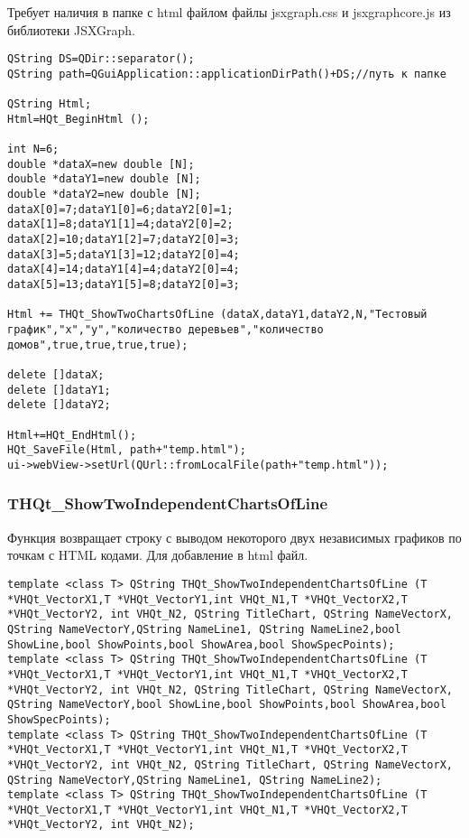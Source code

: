 \documentclass[a4paper,12pt]{article}
\begin{document}
Требует наличия в папке с html файлом файлы jsxgraph.css и jsxgraphcore.js из библиотеки JSXGraph.


\begin{lstlisting}[label=code_use_THQt_ShowTwoChartsOfLine,caption=Пример использования]
QString DS=QDir::separator();
QString path=QGuiApplication::applicationDirPath()+DS;//путь к папке

QString Html;
Html=HQt_BeginHtml ();

int N=6;
double *dataX=new double [N];
double *dataY1=new double [N];
double *dataY2=new double [N];
dataX[0]=7;dataY1[0]=6;dataY2[0]=1;
dataX[1]=8;dataY1[1]=4;dataY2[0]=2;
dataX[2]=10;dataY1[2]=7;dataY2[0]=3;
dataX[3]=5;dataY1[3]=12;dataY2[0]=4;
dataX[4]=14;dataY1[4]=4;dataY2[0]=4;
dataX[5]=13;dataY1[5]=8;dataY2[0]=3;

Html += THQt_ShowTwoChartsOfLine (dataX,dataY1,dataY2,N,"Тестовый график","x","y","количество деревьев","количество домов",true,true,true,true);

delete []dataX;
delete []dataY1;
delete []dataY2;

Html+=HQt_EndHtml();
HQt_SaveFile(Html, path+"temp.html");
ui->webView->setUrl(QUrl::fromLocalFile(path+"temp.html"));
\end{lstlisting}

\subsubsection{THQt\_ShowTwoIndependentChartsOfLine}\label{THQt_ShowTwoIndependentChartsOfLine}

Функция возвращает строку с выводом некоторого двух независимых графиков по точкам с HTML кодами. Для добавление в html файл.


\begin{lstlisting}[label=code_syntax_THQt_ShowTwoIndependentChartsOfLine,caption=Синтаксис]
template <class T> QString THQt_ShowTwoIndependentChartsOfLine (T *VHQt_VectorX1,T *VHQt_VectorY1,int VHQt_N1,T *VHQt_VectorX2,T *VHQt_VectorY2, int VHQt_N2, QString TitleChart, QString NameVectorX, QString NameVectorY,QString NameLine1, QString NameLine2,bool ShowLine,bool ShowPoints,bool ShowArea,bool ShowSpecPoints);
template <class T> QString THQt_ShowTwoIndependentChartsOfLine (T *VHQt_VectorX1,T *VHQt_VectorY1,int VHQt_N1,T *VHQt_VectorX2,T *VHQt_VectorY2, int VHQt_N2, QString TitleChart, QString NameVectorX, QString NameVectorY,bool ShowLine,bool ShowPoints,bool ShowArea,bool ShowSpecPoints);
template <class T> QString THQt_ShowTwoIndependentChartsOfLine (T *VHQt_VectorX1,T *VHQt_VectorY1,int VHQt_N1,T *VHQt_VectorX2,T *VHQt_VectorY2, int VHQt_N2, QString TitleChart, QString NameVectorX, QString NameVectorY,QString NameLine1, QString NameLine2);
template <class T> QString THQt_ShowTwoIndependentChartsOfLine (T *VHQt_VectorX1,T *VHQt_VectorY1,int VHQt_N1,T *VHQt_VectorX2,T *VHQt_VectorY2, int VHQt_N2);
\end{lstlisting}
\end{document}
